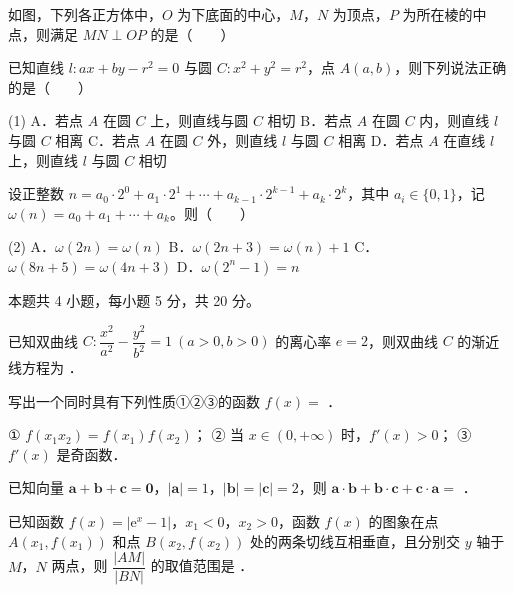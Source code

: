 如图，下列各正方体中，$O$ 为下底面的中心，$M$，$N$ 为顶点，$P$ 为所在棱的中点，则满足 $MN\perp OP$ 的是（　　）

\begin{center}\end{center}

已知直线 $l:ax+by-r^{2}=0$ 与圆 $C:x^{2}+y^{2}=r^{2}$，点 $A(a,b)$，则下列说法正确的是（　　）

\begin{gkopts}(1)
\task A．若点 $A$ 在圆 $C$ 上，则直线与圆 $C$ 相切
\task B．若点 $A$ 在圆 $C$ 内，则直线 $l$ 与圆 $C$ 相离
\task C．若点 $A$ 在圆 $C$ 外，则直线 $l$ 与圆 $C$ 相离
\task D．若点 $A$ 在直线 $l$ 上，则直线 $l$ 与圆 $C$ 相切
\end{gkopts}

设正整数 $n=a_0\cdot2^{0}+a_1\cdot2^{1}+\cdots+a_{k-1}\cdot2^{k-1}+a_k\cdot2^{k}$，其中 $a_i\in\{0,1\}$，记 $\omega(n)=a_0+a_1+\cdots+a_k$。则（　　）

\begin{gkopts}(2)
\task A．$\omega(2n)=\omega(n)$
\task B．$\omega(2n+3)=\omega(n)+1$
\task C．$\omega(8n+5)=\omega(4n+3)$
\task D．$\omega\left(2^{n}-1\right)=n$
\end{gkopts}

\par\medskip


\begin{gktip}
本题共 4 小题，每小题 5 分，共 20 分。
\end{gktip}

已知双曲线 $C:\dfrac{x^{2}}{a^{2}}-\dfrac{y^{2}}{b^{2}}=1\ (a>0,b>0)$ 的离心率 $e=2$，则双曲线 $C$ 的渐近线方程为 \gkblank{}．

写出一个同时具有下列性质①②③的函数 $f(x)=$ \gkblank{}．

  ① $f\left(x_1x_2\right)=f\left(x_1\right)f\left(x_2\right)$；
  ② 当 $x\in(0,+\infty)$ 时，$f'(x)>0$；
  ③ $f'(x)$ 是奇函数．

已知向量 $\boldsymbol a+\boldsymbol b+\boldsymbol c=\boldsymbol 0$，$|\boldsymbol a|=1$，$|\boldsymbol b|=|\boldsymbol c|=2$，则 $\boldsymbol a\cdot\boldsymbol b+\boldsymbol b\cdot\boldsymbol c+\boldsymbol c\cdot\boldsymbol a=$ \gkblank{}．

已知函数 $f(x)=\left|\mathrm e^{x}-1\right|$，$x_1<0$，$x_2>0$，函数 $f(x)$ 的图象在点 $A\left(x_1,f\left(x_1\right)\right)$ 和点 $B\left(x_2,f\left(x_2\right)\right)$ 处的两条切线互相垂直，且分别交 $y$ 轴于 $M$，$N$ 两点，则 $\dfrac{|AM|}{|BN|}$ 的取值范围是 \gkblank{}．

